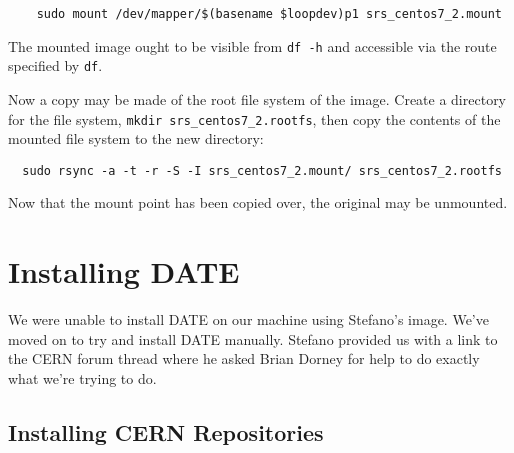 \documentclass[12pt]{article}
\begin{document}
\begin{tcolorbox}[title=Mount Image, colback=white, colframe=black,
  coltitle=green]
  \begin{verbatim}
    sudo mount /dev/mapper/$(basename $loopdev)p1 srs_centos7_2.mount
  \end{verbatim}
\end{tcolorbox}

The mounted image ought to be visible from {\tt df -h} and accessible via the
route specified by {\tt df}.


\qq Now a copy may be made of the root file system of the image. Create a
directory for the file system, {\tt mkdir srs\_centos7\_2.rootfs}, then copy the
contents of the mounted file system to the new directory: 

\begin{verbatim}
  sudo rsync -a -t -r -S -I srs_centos7_2.mount/ srs_centos7_2.rootfs
\end{verbatim}

Now that the mount point has been copied over, the original may be unmounted.

\section{Installing DATE}

\qq We were unable to install DATE on our machine using Stefano's image. We've
moved on to try and install DATE manually. Stefano provided us with a link to
the CERN forum thread where he asked Brian Dorney for help to do exactly what
we're trying to do.

\subsection{Installing CERN Repositories}
\end{document}
